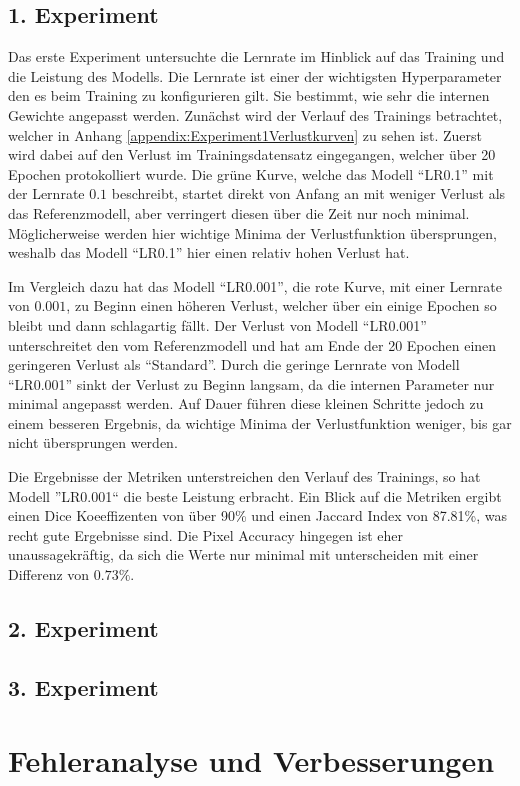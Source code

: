 \subsection{1. Experiment}
Das erste Experiment untersuchte die Lernrate im Hinblick auf das Training und die Leistung des \gls{Modell}s. Die Lernrate ist einer der wichtigsten Hyperparameter den es beim Training zu konfigurieren gilt. Sie bestimmt, wie sehr die internen Gewichte angepasst werden. Zunächst wird der Verlauf des Trainings betrachtet, welcher in Anhang \ref{appendix:Experiment1Verlustkurven} zu sehen ist. Zuerst wird dabei auf den Verlust im Trainingsdatensatz eingegangen, welcher über 20 Epochen protokolliert wurde. Die grüne Kurve, welche das Modell ``LR0.1'' mit der Lernrate $0.1$ beschreibt, startet direkt von Anfang an mit weniger Verlust als das Referenzmodell, aber verringert diesen über die Zeit nur noch minimal. Möglicherweise werden hier wichtige Minima der Verlustfunktion übersprungen, weshalb das  Modell ``LR0.1'' hier einen relativ hohen Verlust hat.

Im Vergleich dazu hat das Modell ``LR0.001'', die rote Kurve, mit einer Lernrate von $0.001$, zu Beginn einen höheren Verlust, welcher über ein einige Epochen so bleibt und dann schlagartig fällt. Der Verlust von Modell ``LR0.001'' unterschreitet den vom Referenzmodell und hat am Ende der 20 Epochen einen geringeren Verlust als ``Standard''. Durch die geringe Lernrate von Modell ``LR0.001'' sinkt der Verlust zu Beginn langsam, da die internen Parameter nur minimal angepasst werden. Auf Dauer führen diese kleinen Schritte jedoch zu einem besseren Ergebnis, da wichtige Minima der Verlustfunktion weniger, bis gar nicht übersprungen werden.

Die Ergebnisse der Metriken unterstreichen den Verlauf des Trainings, so hat Modell ''LR0.001`` die beste Leistung erbracht. Ein Blick auf die Metriken ergibt einen Dice Koeeffizenten von über 90\% und einen Jaccard Index von 87.81\%, was recht gute Ergebnisse sind. Die Pixel Accuracy hingegen ist eher unaussagekräftig, da sich die Werte nur minimal mit unterscheiden mit einer Differenz von $0.73\%$.

\subsection{2. Experiment}
\subsection{3. Experiment}

\section{Fehleranalyse und Verbesserungen}
